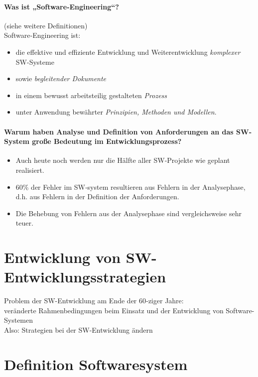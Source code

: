\paragraph{Was ist „Software‐Engineering“?} (siehe weitere Definitionen)\\
Software‐Engineering ist:
\begin{itemize}
\item die effektive und effiziente Entwicklung und Weiterentwicklung \emph{komplexer} SW-Systeme
\item sowie \emph{begleitender Dokumente}
\item in einem bewusst arbeitsteilig gestalteten \emph{Prozess}
\item unter Anwendung bewährter \emph{Prinzipien, Methoden und Modellen}.
\end{itemize}
\paragraph{Warum haben Analyse und Definition von Anforderungen an das SW‐System große Bedeutung
im Entwicklungsprozess?}
\begin{itemize}
\item Auch heute noch werden nur die Hälfte aller SW‐Projekte wie geplant realisiert.
\item 60\% der Fehler im SW‐system resultieren aus Fehlern in der Analysephase, d.h. aus Fehlern in der Definition der Anforderungen.
\item Die Behebung von Fehlern aus der Analysephase sind vergleichsweise sehr teuer.
\end{itemize}


\section{Entwicklung von SW-Entwicklungsstrategien}
Problem der SW-Entwicklung am Ende der 60‐ziger Jahre:\\
veränderte Rahmenbedingungen beim Einsatz und der Entwicklung von Software-Systemen\\
Also: Strategien bei der SW-Entwicklung ändern

\section{Definition Softwaresystem}
